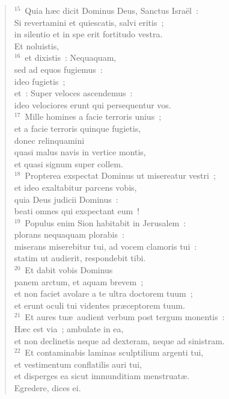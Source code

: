 \begin{verse}
${}^{15}$~Quia h\ae c dicit Dominus Deus, Sanctus Isra\"el~:\\ Si revertamini et quiescatis, salvi eritis~;\\ in silentio et in spe erit fortitudo vestra.\\ Et noluistis,\\
${}^{16}$~et dixistis~: Nequaquam,\\ sed ad equos fugiemus~:\\ ideo fugietis~;\\ et~: Super veloces ascendemus~:\\ ideo velociores erunt qui persequentur vos.\\
${}^{17}$~Mille homines a facie terroris unius~;\\ et a facie terroris quinque fugietis,\\ donec relinquamini\\ quasi malus navis in vertice montis,\\ et quasi signum super collem.\\
${}^{18}$~Propterea exspectat Dominus ut misereatur vestri~;\\ et ideo exaltabitur parcens vobis,\\ quia Deus judicii Dominus~:\\ beati omnes qui exspectant eum~!\\
${}^{19}$~Populus enim Sion habitabit in Jerusalem~:\\ plorans nequaquam plorabis~:\\ miserans miserebitur tui, ad vocem clamoris tui~:\\ statim ut audierit, respondebit tibi.\\
${}^{20}$~Et dabit vobis Dominus\\ panem arctum, et aquam brevem~;\\ et non faciet avolare a te ultra doctorem tuum~;\\ et erunt oculi tui videntes pr\ae ceptorem tuum.\\
${}^{21}$~Et aures tu\ae\ audient verbum post tergum monentis~:\\ H\ae c est via~; ambulate in ea,\\ et non declinetis neque ad dexteram, neque ad sinistram.\\
${}^{22}$~Et contaminabis laminas sculptilium argenti tui,\\ et vestimentum conflatilis auri tui,\\ et disperges ea sicut immunditiam menstruat\ae .\\ Egredere, dices ei.\\

\end{verse}
